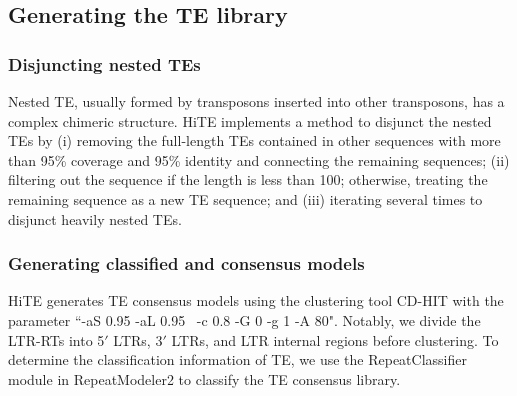 \documentclass{bmcart}
\begin{document}
\subsection*{Generating the TE library}
\subsubsection*{Disjuncting nested TEs}
Nested TE, usually formed by transposons inserted into other transposons, has a complex chimeric structure. HiTE implements a method to disjunct the nested TEs by (i) removing the full-length TEs contained in other sequences with more than 95\% coverage and 95\% identity and connecting the remaining sequences; (ii) filtering out the sequence if the length is less than 100; otherwise, treating the remaining sequence as a new TE sequence; and (iii) iterating several times to disjunct heavily nested TEs.

\subsubsection*{Generating classified and consensus models}
HiTE generates TE consensus models using the clustering tool CD-HIT\cite{li2006cd} with the parameter ``-aS 0.95 -aL 0.95  -c 0.8 -G 0 -g 1 -A 80". Notably, we divide the LTR-RTs into 5$'$ LTRs, 3$'$ LTRs, and LTR internal regions before clustering. To determine the classification information of TE, we use the RepeatClassifier module in RepeatModeler2\cite{flynn2020repeatmodeler2} to classify the TE consensus library.




%
\end{document}
